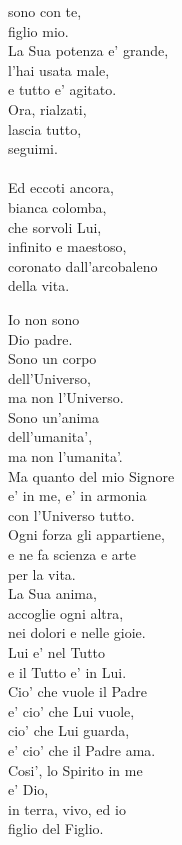 \begin{haiku}
sono con te,\\
figlio mio.\\
La Sua potenza e' grande,\\
l'hai usata male,\\
e tutto e' agitato.\\
Ora, rialzati,\\
lascia tutto,\\
seguimi.\\
\leavevmode\\
Ed eccoti ancora,\\
bianca colomba,\\
che sorvoli Lui,\\
infinito e maestoso,\\
coronato dall'arcobaleno\\
della vita.\\
\end{haiku}


\begin{haiku}
Io non sono\\
Dio padre.\\
Sono un corpo \\
dell'Universo,\\
ma non l'Universo.\\
Sono un'anima\\
dell'umanita',\\
ma non l'umanita'.\\
Ma quanto del mio Signore\\
e' in me, e' in armonia \\
    con l'Universo tutto.\\
Ogni forza gli appartiene,\\
e ne fa scienza e arte\\
per la vita.\\
La Sua anima,\\
accoglie ogni altra,\\
nei dolori e nelle gioie.\\
Lui e' nel Tutto \\
e il Tutto e' in Lui.\\
Cio' che vuole il Padre\\
e' cio' che Lui vuole,\\
cio' che Lui guarda,\\
e' cio' che il Padre ama.\\
Cosi', lo Spirito in me\\
    e' Dio,\\
in terra, vivo, ed io\\
figlio del Figlio.\\
\end{haiku}

